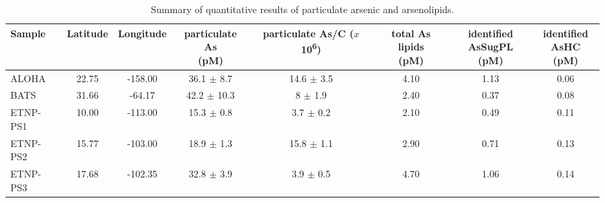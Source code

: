\begin{table}[ht]
\centering
\begingroup\fontsize{7pt}{8pt}\selectfont
\begin{tabular}{p{1.2cm}c{1.1cm}c{1.1cm}c{2cm}c{2cm}c{1.6cm}c{1.6cm}c{1.6cm}}
  \hline
Sample & Latitude & Longitude & \makecell{particulate As \\ (pM)} & \makecell{particulate As/C \\ ($x$10\textsuperscript{6})} & \makecell{total As lipids \\ (pM)} & \makecell{identified  \\ AsSugPL (pM)} & \makecell{identified  \\ AsHC (pM)} \\ 
  \hline
ALOHA & 22.75 & -158.00 & 36.1  $\pm$ 8.7 & 14.6  $\pm$ 3.5 & 4.10 & 1.13 & 0.06 \\ 
  BATS & 31.66 & -64.17 & 42.2  $\pm$ 10.3 & 8  $\pm$ 1.9 & 2.40 & 0.37 & 0.08 \\ 
  ETNP-PS1 & 10.00 & -113.00 & 15.3  $\pm$ 0.8 & 3.7  $\pm$ 0.2 & 2.10 & 0.49 & 0.11 \\ 
  ETNP-PS2 & 15.77 & -103.00 & 18.9  $\pm$ 1.3 & 15.8  $\pm$ 1.1 & 2.90 & 0.71 & 0.13 \\ 
  ETNP-PS3 & 17.68 & -102.35 & 32.8  $\pm$ 3.9 & 3.9  $\pm$ 0.5 & 4.70 & 1.06 & 0.14 \\ 
   \hline
\end{tabular}
\endgroup
\caption{\label{QuanSummaryTable}Summary of quantitative results of particulate arsenic and arsenolipids.} 
\end{table}
